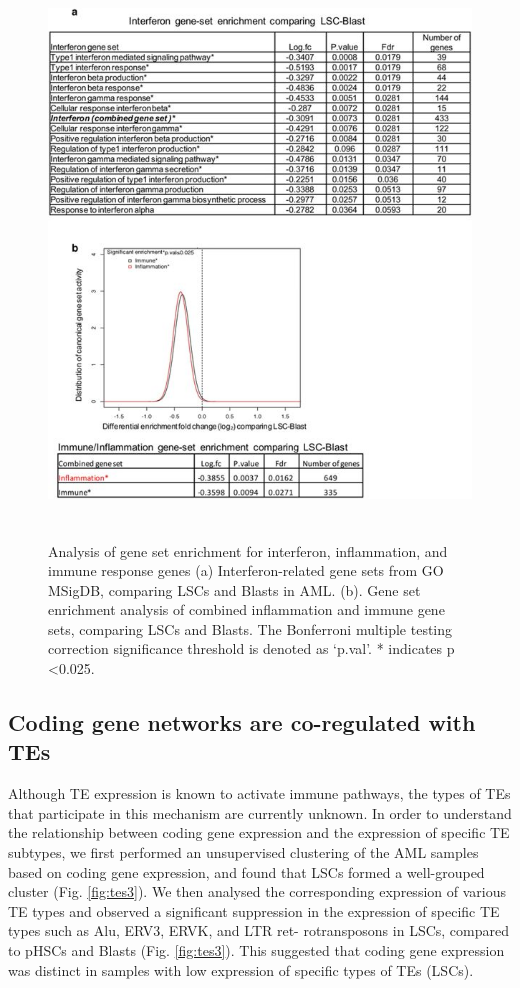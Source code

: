 \begin{figure}[h!]
\centering
\includegraphics[height = 15cm, width = 15cm]{tex/tes/41598_2017_7356_Fig2_HTML.jpg}
\caption{Analysis of gene set enrichment for interferon, inflammation, and immune response genes (a) Interferon-related gene sets from GO MSigDB, comparing LSCs and Blasts in AML. (b). Gene set enrichment analysis of combined inflammation and immune gene sets, comparing LSCs and Blasts.  The Bonferroni multiple testing correction significance threshold is denoted as `p.val'. * indicates p \textless 0.025.}
\label{fig:tes2}
\end{figure}

\subsection{Coding gene networks are co-regulated with TEs}
Although TE expression is known to activate immune pathways, the types of TEs that participate in this mechanism are currently unknown. In order to understand the relationship between coding gene expression and the expression of specific TE subtypes, we first performed an unsupervised clustering of the AML samples based on coding gene expression, and found that LSCs formed a well-grouped cluster (Fig. \ref{fig:tes3}). We then analysed the corresponding expression of various TE types and observed a significant suppression in the expression of specific TE types such as Alu, ERV3, ERVK, and LTR ret- rotransposons in LSCs, compared to pHSCs and Blasts (Fig. \ref{fig:tes3}). This suggested that coding gene expression was distinct in samples with low expression of specific types of TEs (LSCs).

